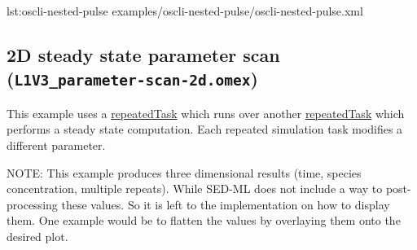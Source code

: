 {lst:oscli-nested-pulse}
{examples/oscli-nested-pulse/oscli-nested-pulse.xml}


\subsection{2D steady state parameter scan (\texttt{L1V3\_parameter-scan-2d.omex})}
This example uses a \hyperref[class:repeatedTask]{repeatedTask} which runs over another \hyperref[class:repeatedTask]{repeatedTask} which performs a steady state computation. Each repeated simulation task modifies a different parameter.

NOTE: This example produces three dimensional results (time, species concentration, multiple repeats). While SED-ML \currentLV does not include a way to post-processing these values. So it is left to the implementation on how to display them. One example would be to flatten the values by overlaying them onto the desired plot. 

